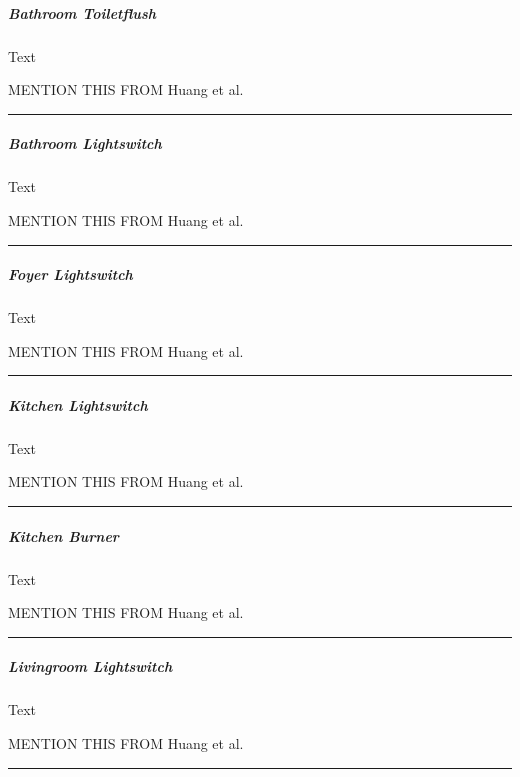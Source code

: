 \documentclass[11pt]{article}
\begin{document}
    \hypertarget{bathroom-toiletflush}{%
\subparagraph{Bathroom Toiletflush}\label{bathroom-toiletflush}}

    Text

    MENTION THIS FROM Huang et al.~

\begin{center}\rule{0.5\linewidth}{\linethickness}\end{center}

    \hypertarget{bathroom-lightswitch}{%
\subparagraph{Bathroom Lightswitch}\label{bathroom-lightswitch}}

    Text

    MENTION THIS FROM Huang et al.~

\begin{center}\rule{0.5\linewidth}{\linethickness}\end{center}

    \hypertarget{foyer-lightswitch}{%
\subparagraph{Foyer Lightswitch}\label{foyer-lightswitch}}

    Text

    MENTION THIS FROM Huang et al.~

\begin{center}\rule{0.5\linewidth}{\linethickness}\end{center}

    \hypertarget{kitchen-lightswitch}{%
\subparagraph{Kitchen Lightswitch}\label{kitchen-lightswitch}}

    Text

    MENTION THIS FROM Huang et al.~

\begin{center}\rule{0.5\linewidth}{\linethickness}\end{center}

    \hypertarget{kitchen-burner}{%
\subparagraph{Kitchen Burner}\label{kitchen-burner}}

    Text

    MENTION THIS FROM Huang et al.~

\begin{center}\rule{0.5\linewidth}{\linethickness}\end{center}

    \hypertarget{livingroom-lightswitch}{%
\subparagraph{Livingroom Lightswitch}\label{livingroom-lightswitch}}

    Text

    MENTION THIS FROM Huang et al.~

\begin{center}\rule{0.5\linewidth}{\linethickness}\end{center}
\end{document}
